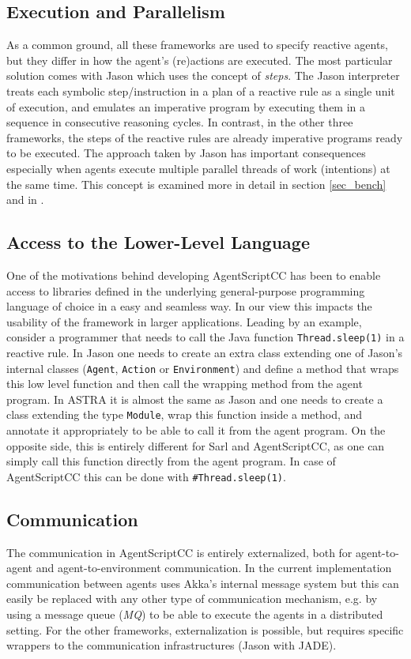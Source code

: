\subsection{Execution and Parallelism}
\label{subsec:par}
As a common ground, all these frameworks are used to specify reactive agents, but they differ in how the agent's (re)actions are executed. The most particular solution comes with Jason which uses the concept of \textit{steps}. The Jason interpreter treats each symbolic step/instruction in a plan of a reactive rule as a single unit of execution, and emulates an imperative program by executing them in a sequence in consecutive reasoning cycles. In contrast, in the other three frameworks, the steps of the reactive rules are already imperative programs ready to be executed. The approach taken by Jason has important consequences especially when agents execute multiple parallel threads of work (intentions) at the same time. This concept is examined more in detail in section \ref{sec_bench} and in \cite{Astra}.

\subsection{Access to the Lower-Level Language}
One of the motivations behind developing AgentScriptCC has been to enable access to libraries defined in the underlying general-purpose programming language of choice in a easy and seamless way. In our view this impacts the usability of the framework in larger applications. Leading by an example, consider a programmer that needs to call the Java function \verb+Thread.sleep(1)+ in a reactive rule. In Jason one needs to create an extra class extending one of Jason's internal classes (\verb+Agent+, \verb+Action+ or \verb+Environment+) and define a method that wraps this low level function and then call the wrapping method from the agent program. In ASTRA it is almost the same as Jason and one needs to create a class extending the type \verb+Module+, wrap this function inside a method, and annotate it appropriately to be able to call it from the agent program. On the opposite side, this is entirely different for Sarl and AgentScriptCC, as one can simply call this function directly from the agent program. In case of AgentScriptCC this can be done with \verb+#Thread.sleep(1)+.

\subsection{Communication}
The communication in AgentScriptCC is entirely externalized, both for agent-to-agent and agent-to-environment communication. In the current implementation communication between agents uses Akka's internal message system but this can easily be replaced with any other type of communication mechanism, e.g. by using a message queue (\textit{MQ}) to be able to execute the agents in a distributed setting. For the other frameworks, externalization is possible, but requires specific wrappers to the communication infrastructures (Jason with JADE).

